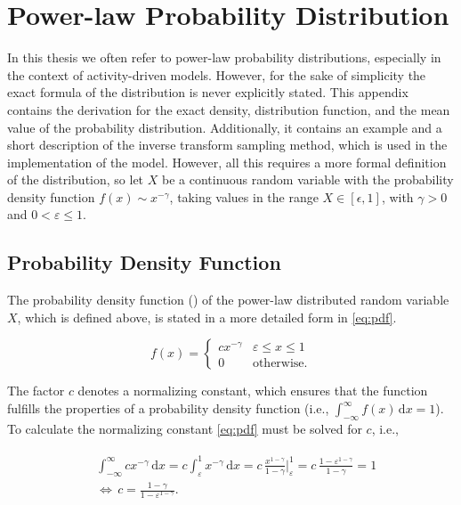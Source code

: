 \chapter{Power-law Probability Distribution}


In this thesis we often refer to power-law probability distributions, especially in the context of activity-driven models.
However, for the sake of simplicity the exact formula of the distribution is never explicitly stated.
This appendix contains the derivation for the exact density, distribution function, and the mean value of the probability distribution.
Additionally, it contains an example and a short description of the inverse transform sampling method, which is used in the implementation of the model.
However, all this requires a more formal definition of the distribution, so let \( X \) be a continuous random variable with the probability density function \( f(x) \sim x^{-\gamma} \), taking values in the range \( X \in [\epsilon, 1] \), with \( \gamma > 0 \) and \( 0 < \varepsilon \leq 1 \).




\section{Probability Density Function}
\label{sec:pdf}

The probability density function () of the power-law distributed random variable \(X\), which is defined above, is stated in a more detailed form in \cref{eq:pdf}.

\begin{equation}
	f(x) =
	\begin{cases}
		c x^{-\gamma} & \varepsilon \leq x \leq 1 \\
		0             & \text{otherwise.}
	\end{cases}
\label{eq:pdf}
\end{equation}

The factor \( c \) denotes a normalizing constant, which ensures that the function fulfills the properties of a probability density function (i.e., \( \int_{-\infty}^{\infty} f(x) \, \mathrm{d}x = 1 \)).
To calculate the normalizing constant \cref{eq:pdf} must be solved for \( c \), i.e.,

\begin{align}
\begin{split}
	& \int_{-\infty}^{\infty} cx^{-\gamma} \, \mathrm{d}x = c \int_{\varepsilon}^{1} x^{-\gamma} \, \mathrm{d}x = c \, \frac{x^{1-\gamma}}{1-\gamma}  \bigg |_{\varepsilon}^{1} = c \, \frac{1 - \varepsilon^{1-\gamma}}{1-\gamma} = 1 \\
	& \Leftrightarrow \, c = \frac{1-\gamma}{1 - \varepsilon^{1-\gamma}}.
\end{split}
\label{eq:normalizing-const}
\end{align}


